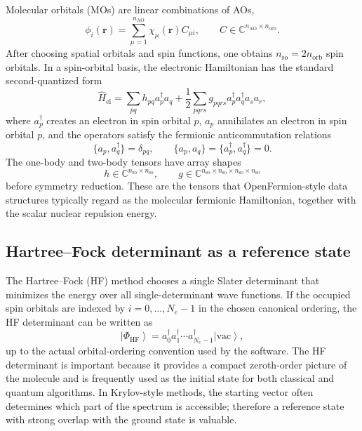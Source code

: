 \documentclass[11pt]{article}
\newcommand{\ket}[1]{\left|#1\right\rangle}
\begin{document}
Molecular orbitals (MOs) are linear combinations of AOs,
\begin{equation}
    \phi_i(\mathbf{r}) = \sum_{\mu=1}^{n_{\mathrm{AO}}}\chi_\mu(\mathbf{r}) C_{\mu i},
    \qquad C\in\mathbb{C}^{n_{\mathrm{AO}}\times n_{\mathrm{orb}}}.
\end{equation}
After choosing spatial orbitals and spin functions, one obtains $n_{\mathrm{so}}=2n_{\mathrm{orb}}$ spin orbitals.  In a spin-orbital basis, the electronic Hamiltonian has the standard second-quantized form
\begin{equation}
    \hat{H}_{\mathrm{el}}
    = \sum_{pq} h_{pq} a_p^\dagger a_q
    + \frac{1}{2}\sum_{pqrs} g_{pqrs} a_p^\dagger a_q^\dagger a_s a_r,
    \label{eq:second_quantized_hamiltonian}
\end{equation}
where $a_p^\dagger$ creates an electron in spin orbital $p$, $a_p$ annihilates an electron in spin orbital $p$, and the operators satisfy the fermionic anticommutation relations
\begin{equation}
    \{a_p,a_q^\dagger\}=\delta_{pq},\qquad
    \{a_p,a_q\}=\{a_p^\dagger,a_q^\dagger\}=0.
\end{equation}
The one-body and two-body tensors have array shapes
\begin{equation}
    h\in\mathbb{C}^{n_{\mathrm{so}}\times n_{\mathrm{so}}},
    \qquad
    g\in\mathbb{C}^{n_{\mathrm{so}}\times n_{\mathrm{so}}\times n_{\mathrm{so}}\times n_{\mathrm{so}}}
\end{equation}
before symmetry reduction.  These are the tensors that OpenFermion-style data structures typically regard as the molecular fermionic Hamiltonian, together with the scalar nuclear repulsion energy.

\subsection{Hartree--Fock determinant as a reference state}

The Hartree--Fock (HF) method chooses a single Slater determinant that minimizes the energy over all single-determinant wave functions.  If the occupied spin orbitals are indexed by $i=0,\ldots,N_e-1$ in the chosen canonical ordering, the HF determinant can be written as
\begin{equation}
    \ket{\Phi_{\mathrm{HF}}}
    = a_0^\dagger a_1^\dagger\cdots a_{N_e-1}^\dagger\ket{\mathrm{vac}},
\end{equation}
up to the actual orbital-ordering convention used by the software.  The HF determinant is important because it provides a compact zeroth-order picture of the molecule and is frequently used as the initial state for both classical and quantum algorithms.  In Krylov-style methods, the starting vector often determines which part of the spectrum is accessible; therefore a reference state with strong overlap with the ground state is valuable.
\end{document}
